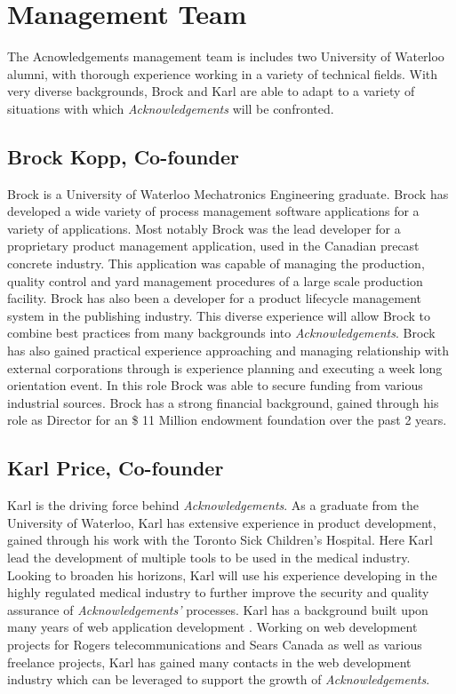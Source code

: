 \section{Management Team}

The Acnowledgements management team is includes two University of Waterloo alumni, with thorough experience working in a variety of technical fields. With very diverse backgrounds, Brock and Karl are able to adapt to a variety of situations with which {\it Acknowledgements} will be confronted.

\subsection{Brock Kopp, Co-founder}
Brock is a University of Waterloo Mechatronics Engineering graduate. Brock has developed a wide variety of process management software applications for a variety of applications. Most notably Brock was the lead developer for a proprietary product management application, used in the Canadian precast concrete industry. This application was capable of managing the production, quality control and yard management procedures of a large scale production facility. Brock has also been a developer for a product lifecycle management system in the publishing industry. This diverse experience will allow Brock to combine best practices from many backgrounds into {\it Acknowledgements}. Brock has also gained practical experience approaching and managing relationship with external corporations through is experience planning and executing a week long orientation event. In this role Brock was able to secure funding from various industrial sources. Brock has a strong financial background, gained through his role as Director for an \$ 11 Million endowment foundation over the past 2 years.

\subsection{Karl Price, Co-founder}
Karl is the driving force behind {\it Acknowledgements}. As a graduate from the University of Waterloo, Karl has extensive experience in product development, gained through his work with the Toronto Sick Children's Hospital. Here Karl lead the development of multiple tools to be used in the medical industry. Looking to broaden his horizons, Karl will use his experience developing in the highly regulated medical industry to further improve the security and quality assurance of {\it Acknowledgements'} processes. Karl has a background built upon many years of web application development . Working on web development projects for Rogers telecommunications and Sears Canada as well as various freelance projects, Karl has gained many contacts in the web development industry which can be leveraged to support the growth of {\it Acknowledgements}.

